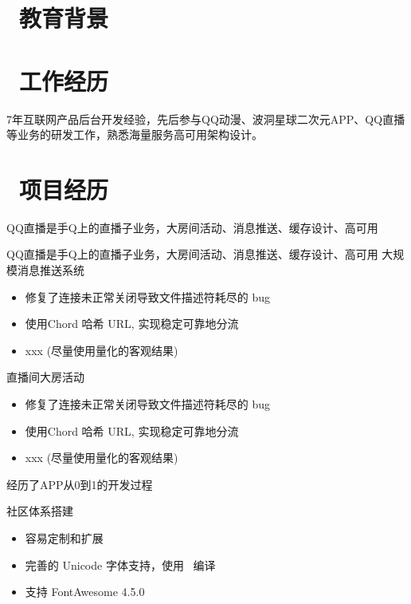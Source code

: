 \documentclass{resume}
\begin{document}


 
\section{\faGraduationCap\ 教育背景}

\section{\faUsers\ 工作经历}
{7年互联网产品后台开发经验，先后参与QQ动漫、波洞星球二次元APP、QQ直播等业务的研发工作，熟悉海量服务高可用架构设计。}
\section{\faThList\ 项目经历}
{QQ直播是手Q上的直播子业务，大房间活动、消息推送、缓存设计、高可用}
\begin{onehalfspacing}
{QQ直播是手Q上的直播子业务，大房间活动、消息推送、缓存设计、高可用}
大规模消息推送系统
\begin{itemize}
  \item 修复了连接未正常关闭导致文件描述符耗尽的 bug
  \item 使用Chord 哈希 URL, 实现稳定可靠地分流
  \item xxx (尽量使用量化的客观结果)
\end{itemize}
\end{onehalfspacing}

\begin{onehalfspacing}
直播间大房活动
\begin{itemize}
  \item 修复了连接未正常关闭导致文件描述符耗尽的 bug
  \item 使用Chord 哈希 URL, 实现稳定可靠地分流
  \item xxx (尽量使用量化的客观结果)
\end{itemize}
\end{onehalfspacing}

{经历了APP从0到1的开发过程}
\begin{onehalfspacing}
社区体系搭建
\begin{itemize}
  \item 容易定制和扩展
  \item 完善的 Unicode 字体支持，使用 \XeLaTeX\ 编译
  \item 支持 FontAwesome 4.5.0
\end{itemize}
\end{onehalfspacing}
\end{document}
